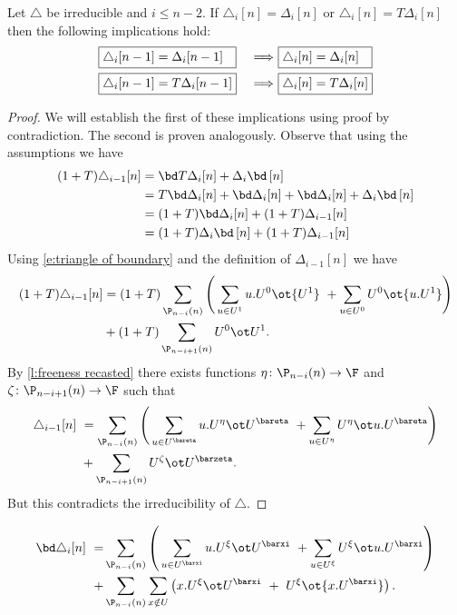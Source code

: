 \begin{lemma}
	Let $\triangle$ be irreducible and $i \leq n-2$.
	If $\triangle_i [n] = \Delta_i [n]$ or $\triangle_i [n] = T \Delta_i [n]$ then the following implications hold:
	\begin{alignat*}{2}
	&\boxed{\triangle_i [n-1] = \Delta_i [n-1] \hspace*{7pt}}\ &\Longrightarrow\
	&\boxed{\triangle_i [n] = \Delta_i [n] \hspace*{7pt}} \\
	&\boxed{\triangle_i [n-1] = T \Delta_i [n-1]}\ &\Longrightarrow\
	&\boxed{\triangle_i [n] = T \Delta_i [n]}
	\end{alignat*}
\end{lemma}

\begin{proof}
	We will establish the first of these implications using proof by contradiction.
	The second is proven analogously.
	Observe that using the assumptions we have
	\begin{align*}
	(1+T) \triangle_{i-1}[n] &=
	\bd T \Delta_i [n] + \Delta_i \bd \, [n] \\ &=
	T \bd \Delta_i [n] + \bd \Delta_i [n] + \bd \Delta_i [n] + \Delta_i \bd \, [n] \\ &=
	(1+T) \bd \Delta_i [n] + (1+T) \Delta_{i-1} [n] \\ &=
	(1+T) \Delta_i \bd \, [n] + (1+T) \Delta_{i-1} [n]
	\end{align*}
	Using \eqref{e:triangle of boundary} and the definition of $\Delta_{i-1} [n]$ we have
	\begin{align*}
	(1+T) \triangle_{i-1}[n] &=
	(1+T) \sum_{\P_{n-i}(n)} \left( \,
	\sum_{u \in U^1} {u.U^0} \ot {U^1} \ +
	\sum_{u \in U^0} {U^0} \ot {u.U^1} \right) \\ &+
	(1+T) \sum_{\P_{n-i+1}(n)} U^0 \ot U^1.
	\end{align*}
	By \cref{l:freeness recasted} there exists functions $\eta \colon \P_{n-i}(n) \to \F$ and $\zeta \colon \P_{n-i+1}(n) \to \F$ such that
	\begin{align*}
	\triangle_{i-1}[n] \ &=
	\sum_{\P_{n-i}(n)} \left( \,
	\sum_{u \in U^\bareta} u.U^\eta \ot U^\bareta \ +
	\sum_{u \in U^\eta} U^\eta \ot u.U^\bareta \right) \\ &+
	\sum_{\P_{n-i+1}(n)} U^\zeta \ot U^\barzeta.
	\end{align*}
	But this contradicts the irreducibility of $\triangle$.
\end{proof}

\newpage
\begin{align*}
\label{equation: boundary of triangle}
\bd \triangle_i [n]\ = &
\sum_{\P_{n-i}(n)} \left( \, \sum_{u \in U^\barxi} u.U^\xi \ot U^\barxi \ +
\sum_{u \in U^\xi} U^\xi \ot u.U^\barxi \right) \\ + &
\sum_{\P_{n-i}(n)} \sum_{x \notin U} \left( x.U^\xi \ot U^\barxi \ +\ U^\xi \ot {x.U^\barxi} \right).
\end{align*}


